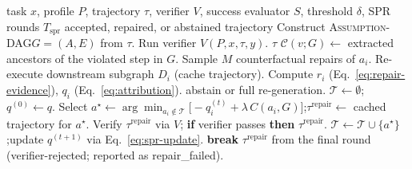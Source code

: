 \documentclass{article}
\newcommand{\method}{\textsc{Intro-Specter}\xspace}
\newcommand{\dagg}{\textsc{Assumption-DAG}\xspace}
\begin{document}
\begin{algorithm}[H]
\caption{\method (full)}\label{alg:intro-specter}
\begin{algorithmic}[1]
  \Require task $x$, profile $P$, trajectory $\tau$, verifier $V$, success evaluator $S$, threshold $\delta$, SPR rounds $T_{\text{spr}}$
  \Ensure  accepted, repaired, or abstained trajectory
  \State Construct \dagg $G = (A, E)$ from $\tau$.
  \State Run verifier $V(P, x, \tau, y)$.
   \Return $\tau$ \EndIf
  \State $\mathcal{C}(v; G) \gets$ extracted ancestors of the violated step in $G$.
    \State Sample $M$ counterfactual repairs of $a_i$.
    \State Re-execute downstream subgraph $D_i$ (cache trajectory).
    \State Compute $r_i$ (Eq.~\ref{eq:repair-evidence}), $q_i$ (Eq.~\ref{eq:attribution}).
  \EndFor
   \Return abstain or full re-generation. \EndIf
  \State $\mathcal{T} \gets \emptyset$;\quad $q^{(0)} \gets q$.
    \State Select $a^\star \gets \arg\min_{a_i \notin \mathcal{T}} \bigl[-q^{(t)}_i + \lambda\, C(a_i, G)\bigr]$;\quad $\tau^{\text{repair}} \gets$ cached trajectory for $a^\star$.
    \State Verify $\tau^{\text{repair}}$ via $V$; \textbf{if} verifier passes \textbf{then} \Return $\tau^{\text{repair}}$.
    \State $\mathcal{T} \gets \mathcal{T} \cup \{a^\star\}$;\quad update $q^{(t+1)}$ via Eq.~\ref{eq:spr-update}.
     \textbf{break} \EndIf
  \EndFor
  \State \Return $\tau^{\text{repair}}$ from the final round (verifier-rejected; reported as repair\_failed).
\end{algorithmic}\end{algorithm}
\end{document}
